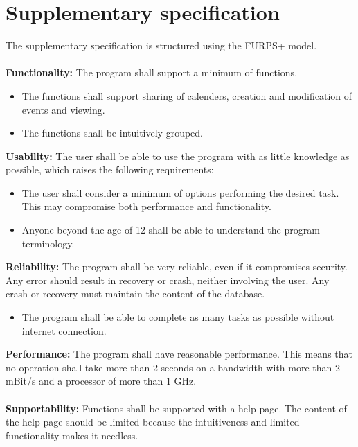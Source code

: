 \documentclass[a4paper,10pt,titlepage]{article}
\begin{document}
\section{Supplementary specification}
	The supplementary specification is structured using the FURPS+ model.
	\\ \\
	\textbf{Functionality:}
	The program shall support a minimum of functions.
	\begin{itemize}
	\item The functions shall support sharing of calenders, creation and modification of events and viewing.
	\item The functions shall be intuitively grouped.
	\\
	\end{itemize}
	\textbf{Usability:}
	The user shall be able to use the program with as little knowledge as possible, which raises the following requirements:
	\begin{itemize}
	\item The user shall consider a minimum of options performing the desired task. This may compromise both performance and functionality.
	\item Anyone beyond the age of 12 shall be able to understand the program terminology. 
	\\
	\end{itemize}
	\textbf{Reliability:}
	The program shall be very reliable, even if it compromises security. Any error should result in recovery or crash, neither involving the user. Any crash or recovery must maintain the content of the database.
	\begin{itemize}
	\item The program shall be able to complete as many tasks as possible without internet connection.
	\\
	\end{itemize}
	\textbf{Performance:}
	The program shall have reasonable performance. This means that no operation shall take more than 2 seconds on a bandwidth with more than 2 mBit/s and a processor of more than 1 GHz.
	\\ \\
	\textbf{Supportability:}
	Functions shall be supported with a help page. The content of the help page should be limited because the intuitiveness and limited functionality makes it needless.
	\\ \\
\end{document}
